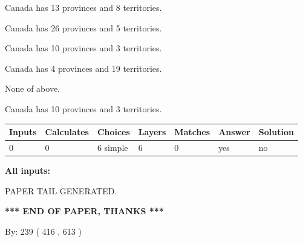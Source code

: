 \documentclass[12pt]{article}
\begin{document}
 
Canada has  13 provinces and  8 territories.
 
 
Canada has  26 provinces and  5 territories.
 
 
Canada has 10  provinces and 3 territories.
 
 
Canada has   4 provinces and  19 territories.
 
 
 None of above.
 
 
\noindent{}
 
 
Canada has 10  provinces and 3 territories.
 
 
\noindent{}
 
 
   
   
   
   
\noindent\begin{tabular}{|l|l|l|l|l|l|l|}
 \hline
Inputs & Calculates & Choices & Layers & Matches & Answer & Solution \\ \hline
 0  & 
 0  & 
 6
  simple  
  & 
 6  & 
 0  & 
  yes & 
  no 
  \\ \hline
 \end{tabular}
   
   
   
   
\noindent{}
   
   
   
   
\noindent\vspace{0.1in}\hspace{-0.08in} {\textbf{\Large{All inputs: }}}
   
   
   
   
   
   
 \vspace{0.2in}
 
   
   
\vspace{2.0in} PAPER TAIL GENERATED.
   
   
   
   
\vspace{1.0in} 
{\textbf{\large{ *** END OF PAPER, THANKS *** }}} 
   
   
\hspace{1.0in} By: 
 239 ( 416 ,  613 )
   
\end{document}
